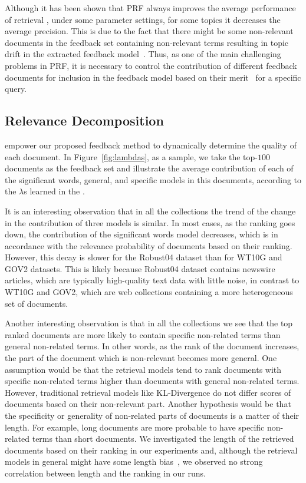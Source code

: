 Although it has been shown that PRF always improves the average performance of retrieval \citep{Harman:2009}, under some parameter settings, for some topics it decreases the average precision.  This is due to the fact that there might be some non-relevant documents in the feedback set containing non-relevant terms resulting in topic drift in the extracted feedback model~\cite{He:2009:ECIR,He:2009:CIKM,Carpineto:2012}. Thus, as one of the main challenging problems in PRF, it is necessary to control the contribution of different feedback documents for inclusion in the feedback model based on their merit~\citep{He:2009:ECIR} for a specific query. 

\subsection{Relevance Decomposition}

\Swlms empower our proposed feedback method to dynamically determine the quality of each document.
In Figure~\ref{fig:lambdas}, as a sample, we take the top-$100$ documents as the feedback set and illustrate the average contribution of each of the significant words, general, and specific models in this documents, according to the $\lambda$s learned in the \rswlms. 

It is an interesting observation that in all the collections the trend of the change in the contribution of three models is similar. 
In most cases, as the ranking goes down, the contribution of the significant words model decreases, which is in accordance with the relevance probability of documents based on their ranking.  However, this decay is slower for the Robust04 dataset than for WT10G and GOV2 datasets.  This is likely because Robust04 dataset contains newswire articles, which are typically high-quality text data with little noise, in contrast to WT10G and GOV2, which are web collections containing a more heterogeneous set of documents.  

Another interesting observation is that in all the collections we see that the top ranked documents are more likely to contain specific non-related terms than general non-related terms. In other words, as the rank of the document increases, the part of the document which is non-relevant becomes more general. 
%
One assumption would be that the retrieval models tend to rank documents with specific non-related terms higher than documents with general non-related terms.  However, traditional retrieval models like KL-Divergence do not differ scores of documents based on their non-relevant part. Another hypothesis would be that the specificity or generality of non-related parts of documents is a matter of their length. For example, long documents are more probable to have specific non-related terms than short documents. We investigated the length of the retrieved documents based on their ranking in our experiments and, although the retrieval models in general might have some length bias~\citep{Losada:2008}, we observed no strong correlation between length and the ranking in our runs.

